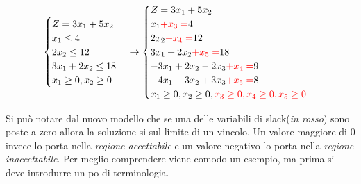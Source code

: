\documentclass{article}
\begin{document}
    $$
      \begin{cases}
        Z = 3x_1 + 5x_2 \\
        x_1 \le 4 \\
        2x_2 \le 12\\
        3x_1+2x_2\le 18\\
        x_1 \ge 0,
        x_2 \ge 0
      \end{cases}
      \to
      \begin{cases}
        Z = 3x_1 + 5x_2\\
        x_1 \textcolor{red}{+x_3 =}  4 \\
        2x_2 \textcolor{red}{+x_4 =}  12\\
        3x_1+2x_2\textcolor{red}{+x_5 =} 18\\
        -3x_1 + 2x_2 - 2x_3 \textcolor{red}{+x_4 =} 9 \\
        -4x_1 - 3x_2 + 3x_3 \textcolor{red}{+x_5 =} 8 \\
        x_1 \ge 0,
        x_2 \ge 0,
        \textcolor{red}{x_3 \ge 0, x_4 \ge 0, x_5 \ge 0}

      \end{cases}
    $$
  
    Si può notare dal nuovo modello che se una delle variabili di slack(\textit{in rosso}) sono poste a zero allora la soluzione si sul limite di un vincolo. Un valore maggiore di $0$ invece lo porta nella \textit{regione accettabile} e un valore negativo lo porta nella \textit{regione inaccettabile}. Per meglio comprendere viene comodo un esempio, ma prima si deve introdurre un po di terminologia.
\end{document}
